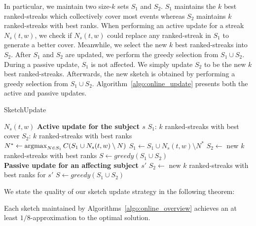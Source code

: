 In particular, we maintain two size-$k$ sets $S_1$ and $S_2$. 
$S_1$ maintains the $k$ best ranked-streaks which collectively cover most
events whereas $S_2$ maintains $k$ ranked-streaks with best ranks. 
When performing an active update for a streak $N_s(t,w)$, 
we check if $N_s(t,w)$ could replace any ranked-streak in $S_1$ 
to generate a better cover. Meanwhile, we select the new 
$k$ best ranked-streaks into $S_2$. 
After $S_1$ and $S_2$ are updated, 
we perform the greedy selection from $S_1 \cup S_2$.
During a passive update, $S_1$ is not affected. We simply update $S_2$ to be the new $k$ best ranked-streaks. 
Afterwards, the new sketch is obtained by performing a greedy selection from $S_1 \cup S_2$. Algorithm~\ref{algo:online_update} presents both the active and passive updates. 
%
\begin{algorithm}
\caption{SketchUpdate}\label{algo:online_update}
\begin{algorithmic} [1]
\Require $N_s(t,w)$
\State \textbf{Active update for the subject $s$}
\State $S_1$:  $k$ ranked-streaks with best cover
\State $S_2$:  $k$ ranked-streaks with best ranks 
\State $N^* \gets \operatorname*{argmax}_{N \in S_1}C(S_1 \cup N_s(t,w) \setminus N)$
\State $S_1 \gets S_1 \cup N_s(t,w) \setminus N^*$
\EndIf
\State $S_2 \gets$ new $k$ ranked-streaks with best ranks 
\State $S \gets greedy(S_1 \cup S_2 )$
\\\hrulefill
\State \textbf{Passive update for an affecting subject $s'$}
\State $S_2 \gets$ new $k$ ranked-streaks with best ranks for $s'$
\State $S \gets greedy(S_1 \cup S_2)$
\end{algorithmic}
\end{algorithm}
  

We state the quality of our sketch update strategy in the
following theorem:
%

\begin{theorem}
\label{thm:online_quality}
Each sketch maintained by Algorithms~\ref{algo:online_overview}
achieves an at least $1/8$-approximation to the optimal solution.
\end{theorem}

